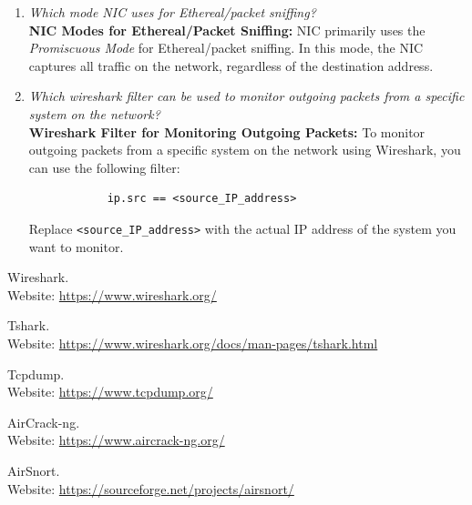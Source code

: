 \documentclass[11pt]{article}
\begin{document}
\begin{enumerate}
	\item \textit{Which mode NIC uses for Ethereal/packet sniffing?}\\

	      \textbf{NIC Modes for Ethereal/Packet Sniffing:} NIC primarily uses the \textit{Promiscuous Mode} for Ethereal/packet sniffing. In this mode, the NIC captures all traffic on the network, regardless of the destination address.
	\item \textit{Which wireshark filter can be used to monitor outgoing packets from a specific
		      system on the network?}\\

	      \textbf{Wireshark Filter for Monitoring Outgoing Packets:} To monitor outgoing packets from a specific system on the network using Wireshark, you can use the following filter:
	      \begin{verbatim}
            ip.src == <source_IP_address>
        \end{verbatim}
	      Replace \texttt{<source\_IP\_address>} with the actual IP address of the system
	      you want to monitor.
\end{enumerate}

\clearpage
\begin{thebibliography}{99}
	Wireshark. \\
	Website: \url{https://www.wireshark.org/}

	Tshark. \\
	Website: \url{https://www.wireshark.org/docs/man-pages/tshark.html}

	Tcpdump. \\
	Website: \url{https://www.tcpdump.org/}

	AirCrack-ng. \\
	Website: \url{https://www.aircrack-ng.org/}

	AirSnort. \\
	Website: \url{https://sourceforge.net/projects/airsnort/}
\end{thebibliography}
\end{document}
